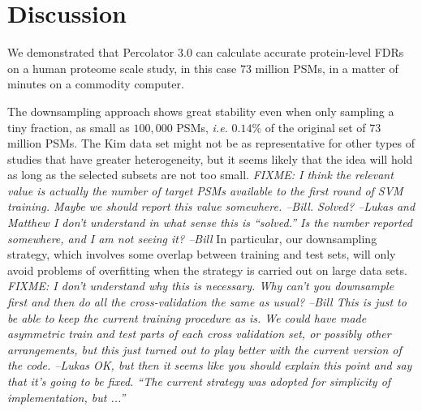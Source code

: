 \documentclass{article}
\begin{document}

\section*{Discussion}

We demonstrated that Percolator 3.0 can calculate accurate
protein-level FDRs on a human proteome scale study, in this case $73$
million PSMs, in a matter of minutes on a commodity computer.

The downsampling approach shows great stability even when only
sampling a tiny fraction, as small as $100,000$ PSMs, {\em i.e.}
$0.14\%$ of the original set of $73$ million PSMs.  The Kim data set
might not be as representative for other types of studies that have
greater heterogeneity, but it seems likely that the idea will hold as
long as the selected subsets are not too small.  {\em FIXME: I think
  the relevant value is actually the number of target PSMs available
  to the first round of SVM training. Maybe we should report this
  value somewhere. --Bill. Solved?  --Lukas and Matthew I don't
  understand in what sense this is ``solved.'' Is the number reported
  somewhere, and I am not seeing it? --Bill } In particular, our
downsampling strategy, which involves some overlap between training
and test sets, will only avoid problems of overfitting when the
strategy is carried out on large data sets.  {\em FIXME: I don't
  understand why this is necessary.  Why can't you downsample first
  and then do all the cross-validation the same as usual? --Bill This
  is just to be able to keep the current training procedure as is. We
  could have made asymmetric train and test parts of each cross
  validation set, or possibly other arrangements, but this just turned
  out to play better with the current version of the code. --Lukas OK,
  but then it seems like you should explain this point and say that
  it's going to be fixed. ``The current strategy was adopted for
  simplicity of implementation, but ...''}
\end{document}
